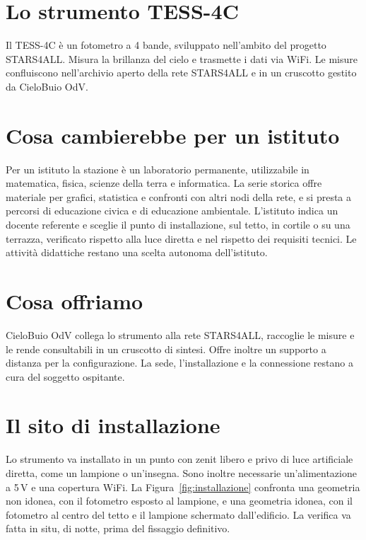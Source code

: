 \documentclass[11pt,a4paper]{report}
\begin{document}
\section*{Lo strumento TESS-4C}

Il TESS-4C è un fotometro a 4 bande, sviluppato nell'ambito del progetto STARS4ALL. Misura la brillanza del cielo e trasmette i dati via WiFi. Le misure confluiscono nell'archivio aperto della rete STARS4ALL e in un cruscotto gestito da CieloBuio OdV.

\section*{Cosa cambierebbe per un istituto}

Per un istituto la stazione è un laboratorio permanente, utilizzabile in matematica, fisica, scienze della terra e informatica. La serie storica offre materiale per grafici, statistica e confronti con altri nodi della rete, e si presta a percorsi di educazione civica e di educazione ambientale. L'istituto indica un docente referente e sceglie il punto di installazione, sul tetto, in cortile o su una terrazza, verificato rispetto alla luce diretta e nel rispetto dei requisiti tecnici. Le attività didattiche restano una scelta autonoma dell'istituto.

\section*{Cosa offriamo}

CieloBuio OdV collega lo strumento alla rete STARS4ALL, raccoglie le misure e le rende consultabili in un cruscotto di sintesi. Offre inoltre un supporto a distanza per la configurazione. La sede, l'installazione e la connessione restano a cura del soggetto ospitante.

\section*{Il sito di installazione}

Lo strumento va installato in un punto con zenit libero e privo di luce artificiale diretta, come un lampione o un'insegna. Sono inoltre necessarie un'alimentazione a 5\,V e una copertura WiFi. La Figura~\ref{fig:installazione} confronta una geometria non idonea, con il fotometro esposto al lampione, e una geometria idonea, con il fotometro al centro del tetto e il lampione schermato dall'edificio. La verifica va fatta in situ, di notte, prima del fissaggio definitivo.
\end{document}
